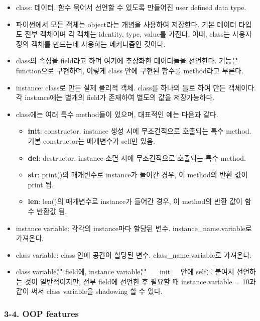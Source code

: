 \begin{itemize}
\tightlist
\item
  class: 데이터, 함수 묶어서 선언할 수 있도록 만들어진 user defined data
  type.
\item
  파이썬에서 모든 객체는 object라는 개념을 사용하여 저장한다. 기본
  데이터 타입도 전부 객체이며 각 객체는 identity, type, value를 가진다.
  이때, class는 사용자 정의 객체를 만드는데 사용하는 메커니즘인 것이다.
\item
  class의 속성을 field라고 하며 여기에 추상화한 데이터들을 선언한다.
  기능은 function으로 구현하며, 이렇게 class 안에 구현된 함수를
  method라고 부른다.
\item
  instance: class로 만든 실제 물리적 객체. class를 하나의 틀로 하여 만든
  객체이다. 각 instance에는 별개의 field가 존재하여 별도의 값을
  저장가능하다.
\item
  class에는 여러 특수 method들이 있으며, 대표적인 예는 다음과 같다.

  \begin{itemize}
  \tightlist
  \item
    \textbf{init}: constructor. instance 생성 시에 무조건적으로 호출되는
    특수 method. 기본 constructor는 매개변수가 self만 있음.
  \item
    \textbf{del}: destructor. instance 소멸 시에 무조건적으로 호출되는
    특수 method.
  \item
    \textbf{str}: print()의 매개변수로 instance가 들어간 경우, 이
    method의 반환 값이 print 됨.
  \item
    \textbf{len}: len()의 매개변수로 instance가 들어간 경우, 이 method의
    반환 값이 함수 반환값 됨.
  \end{itemize}
\item
  instance variable: 각각의 instance마다 할당된 변수.
  instance\_name.variable로 가져온다.
\item
  class variable: class 안에 공간이 할당된 변수. class\_name.variable로
  가져온다.
\item
  class variable은 field에, instance variable은 \_\_init\_\_안에 self를
  붙여서 선언하는 것이 일반적이지만, 전부 field에 선언한 후 필요할 때
  instance.variable = 10과 같이 써서 class variable을 shadowing 할 수
  있다.
\end{itemize}

\hypertarget{oop-features}{%
\subsubsection{3-4. OOP features}\label{oop-features}}

